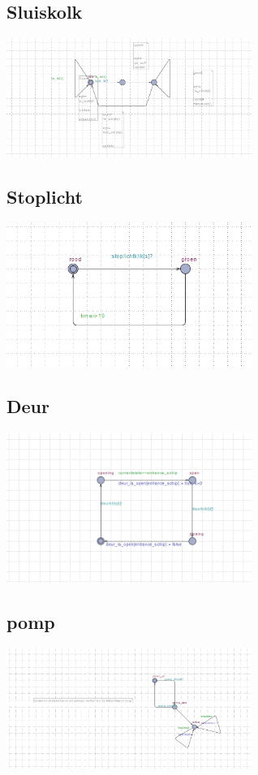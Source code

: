 \documentclass{article}
\begin{document}
	\subsection{Sluiskolk}
	\includegraphics[width=8cm]{sluiskolk.png} %
	\subsection{Stoplicht}
	\includegraphics[width=8cm]{stoplicht.png} %
	\subsection{Deur}	
	\includegraphics[width=8cm]{deur.png} %
	\subsection{pomp}	
	\includegraphics[width=8cm]{pomp.png} %
	
\end{document}
